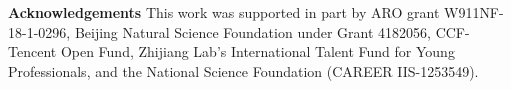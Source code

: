 \documentclass[10pt,twocolumn,letterpaper]{article}
\begin{document}
{\small\noindent\textbf{Acknowledgements} This work was supported in part by ARO grant W911NF-18-1-0296, Beijing Natural Science Foundation under Grant 4182056, CCF-Tencent Open Fund, Zhijiang Lab's International Talent Fund for Young Professionals, and the National Science Foundation (CAREER IIS-1253549).}








{\small


}
\end{document}
